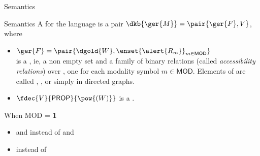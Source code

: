 \documentclass{beamer}
\begin{document}
\begin{slide}{Semantics}\label{s:12}
\small
\begin{block}{Semantics}
A  for the language is a pair $\dkb{\ger{M}} = \pair{\ger{F},V}$, where
\begin{itemize}
\item $\ger{F} = \pair{\dgold{W}, \enset{\alert{R_m}}_{m \in \mathsf{MOD}}}$  \\ is a , ie, a non empty set  and a family of \alert{binary relations} (called \emph{accessibility relations})
over , one for each modality symbol $m \in \mathsf{MOD}$. Elements of  are called ,  ,   or
simply   in  directed graphs. 
\item $\fdec{V}{\mathsf{PROP}}{\pow{(W)}}$ is a .
\end{itemize}
\end{block}


\begin{exampleblock}{When MOD = \textbf{1}}
\begin{itemize}
  \item \dgold{$\eventual \phi$} and \dgold{$\always \phi$} instead of
        \dkb{$\pv{\cdot} \phi$} and \dkb{$\nc{\cdot} \phi$}
  \item {} instead of
\end{itemize}
\end{exampleblock}
\end{slide}
\end{document}
